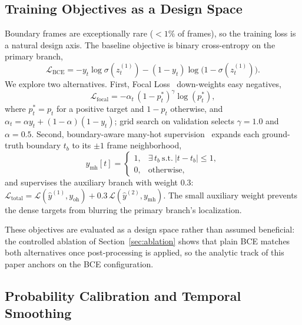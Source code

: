 \subsection{Training Objectives as a Design Space}
\label{sec:objectives}

Boundary frames are exceptionally rare ($<1\%$ of frames), so the training
loss is a natural design axis. The baseline objective is binary
cross-entropy on the primary branch,
\begin{equation}
    \mathcal{L}_{\mathrm{BCE}}
    = -y_t\log\sigma(z^{(1)}_t)-(1-y_t)\log\bigl(1-\sigma(z^{(1)}_t)\bigr).
    \label{eq:bce}
\end{equation}
We explore two alternatives. First, Focal Loss~\cite{lin2017focal}
down-weights easy negatives,
\begin{equation}
    \mathcal{L}_{\mathrm{focal}} = -\alpha_t\,(1-p^{*}_t)^{\gamma}\log(p^{*}_t),
    \label{eq:focal}
\end{equation}
where $p^{*}_t=p_t$ for a positive target and $1-p_t$ otherwise, and
$\alpha_t=\alpha y_t+(1-\alpha)(1-y_t)$; grid search on validation selects
$\gamma=1.0$ and $\alpha=0.5$. Second, boundary-aware many-hot
supervision~\cite{muller2019label} expands each ground-truth boundary $t_b$
to its $\pm1$ frame neighborhood,
\begin{equation}
    y_{\mathrm{mh}}[t]=\begin{cases}1, & \exists\, t_b\ \text{s.t.}\ |t-t_b|\le 1,\\ 0, & \text{otherwise},\end{cases}
    \label{eq:manyhot}
\end{equation}
and supervises the auxiliary branch with weight 0.3:
$\mathcal{L}_{\mathrm{total}}=\mathcal{L}(\hat y^{(1)}, y_{\mathrm{oh}})
+0.3\,\mathcal{L}(\hat y^{(2)}, y_{\mathrm{mh}})$. The small auxiliary
weight prevents the dense targets from blurring the primary branch's
localization.

These objectives are evaluated as a design space rather than assumed
beneficial: the controlled ablation of Section~\ref{sec:ablation} shows that
plain BCE matches both alternatives once post-processing is applied, so the
analytic track of this paper anchors on the BCE configuration.

\subsection{Probability Calibration and Temporal Smoothing}
\label{sec:postprocess}


